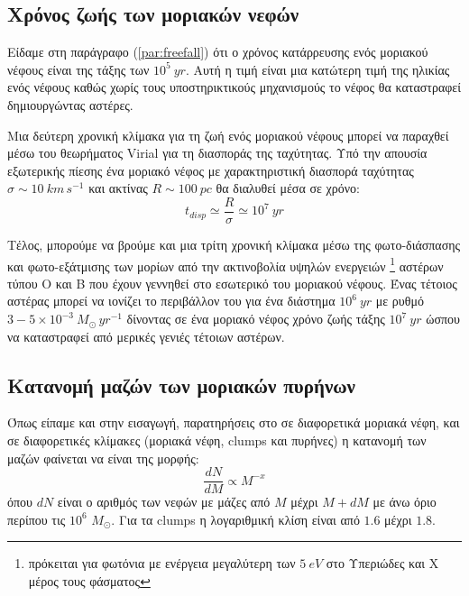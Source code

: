 \documentclass[a4paper,12pt]{memoir}
\newcommand{\sm}{$M_{\odot}$}
\begin{document}
 
 

\subsection{Χρόνος ζωής των μοριακών νεφών}
Είδαμε στη παράγραφο (\ref{par:freefall}) ότι ο χρόνος κατάρρευσης ενός μοριακού νέφους είναι της τάξης των $10^5 \ yr$. Αυτή η τιμή είναι μια κατώτερη τιμή της ηλικίας ενός νέφους καθώς χωρίς τους υποστηρικτικούς μηχανισμούς το νέφος θα καταστραφεί δημιουργώντας αστέρες.

Μια δεύτερη χρονική κλίμακα για τη ζωή ενός μοριακού νέφους μπορεί να παραχθεί μέσω του θεωρήματος Virial για τη διασποράς της ταχύτητας. Υπό την απουσία εξωτερικής πίεσης ένα μοριακό νέφος με χαρακτηριστική διασπορά ταχύτητας $\sigma \sim 10 \ km \, s^{-1}$ και ακτίνας $R \sim 100 \ pc$ θα διαλυθεί μέσα σε χρόνο:
\begin{equation}
t_{disp} \simeq \frac{R}{\sigma} \simeq 10^7 \ yr
\end{equation} 

Τέλος, μπορούμε να βρούμε και μια τρίτη χρονική κλίμακα μέσω της φωτο-διάσπασης και φωτο-εξάτμισης των μορίων από την ακτινοβολία υψηλών ενεργειών \footnote{πρόκειται για φωτόνια με ενέργεια μεγαλύτερη των $5 \ eV$ στο Υπεριώδες και X μέρος τους φάσματος} αστέρων τύπου O και B που έχουν γεννηθεί στο εσωτερικό του μοριακού νέφους. Ένας τέτοιος αστέρας μπορεί να ιονίζει το περιβάλλον του για ένα διάστημα $10^6 \ yr$ με ρυθμό $3-5 \times 10^{-3} \ M_{\odot} \, yr^{-1}$ δίνοντας σε ένα μοριακό νέφος χρόνο ζωής τάξης $10^7 \ yr$ ώσπου να καταστραφεί από μερικές γενιές τέτοιων αστέρων.



\subsection{Κατανομή μαζών των μοριακών πυρήνων} 
Όπως είπαμε και στην εισαγωγή, παρατηρήσεις στο  σε διαφορετικά μοριακά νέφη, και σε διαφορετικές κλίμακες (μοριακά νέφη, clumps και πυρήνες) η κατανομή των μαζών φαίνεται να είναι της μορφής:
\begin{equation}
\frac{dN}{dM} \propto M^{-x}
\end{equation}
όπου $dN$ είναι ο αριθμός των νεφών με μάζες από $M$ μέχρι $M+dM$ με άνω όριο περίπου τις $10^6$ \sm. Για τα clumps η λογαριθμική κλίση είναι από $1.6$ μέχρι $1.8$.
\end{document}
